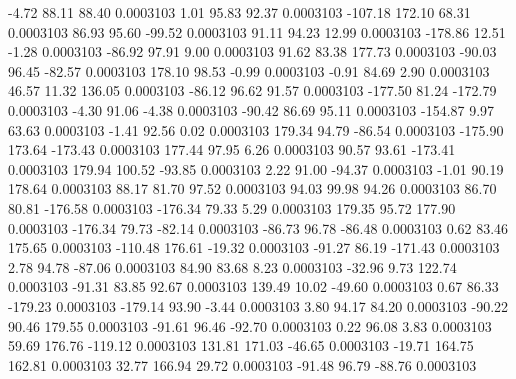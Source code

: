       -4.72       88.11       88.40     0.0003103
        1.01       95.83       92.37     0.0003103
     -107.18      172.10       68.31     0.0003103
       86.93       95.60      -99.52     0.0003103
       91.11       94.23       12.99     0.0003103
     -178.86       12.51       -1.28     0.0003103
      -86.92       97.91        9.00     0.0003103
       91.62       83.38      177.73     0.0003103
      -90.03       96.45      -82.57     0.0003103
      178.10       98.53       -0.99     0.0003103
       -0.91       84.69        2.90     0.0003103
       46.57       11.32      136.05     0.0003103
      -86.12       96.62       91.57     0.0003103
     -177.50       81.24     -172.79     0.0003103
       -4.30       91.06       -4.38     0.0003103
      -90.42       86.69       95.11     0.0003103
     -154.87        9.97       63.63     0.0003103
       -1.41       92.56        0.02     0.0003103
      179.34       94.79      -86.54     0.0003103
     -175.90      173.64     -173.43     0.0003103
      177.44       97.95        6.26     0.0003103
       90.57       93.61     -173.41     0.0003103
      179.94      100.52      -93.85     0.0003103
        2.22       91.00      -94.37     0.0003103
       -1.01       90.19      178.64     0.0003103
       88.17       81.70       97.52     0.0003103
       94.03       99.98       94.26     0.0003103
       86.70       80.81     -176.58     0.0003103
     -176.34       79.33        5.29     0.0003103
      179.35       95.72      177.90     0.0003103
     -176.34       79.73      -82.14     0.0003103
      -86.73       96.78      -86.48     0.0003103
        0.62       83.46      175.65     0.0003103
     -110.48      176.61      -19.32     0.0003103
      -91.27       86.19     -171.43     0.0003103
        2.78       94.78      -87.06     0.0003103
       84.90       83.68        8.23     0.0003103
      -32.96        9.73      122.74     0.0003103
      -91.31       83.85       92.67     0.0003103
      139.49       10.02      -49.60     0.0003103
        0.67       86.33     -179.23     0.0003103
     -179.14       93.90       -3.44     0.0003103
        3.80       94.17       84.20     0.0003103
      -90.22       90.46      179.55     0.0003103
      -91.61       96.46      -92.70     0.0003103
        0.22       96.08        3.83     0.0003103
       59.69      176.76     -119.12     0.0003103
      131.81      171.03      -46.65     0.0003103
      -19.71      164.75      162.81     0.0003103
       32.77      166.94       29.72     0.0003103
      -91.48       96.79      -88.76     0.0003103
